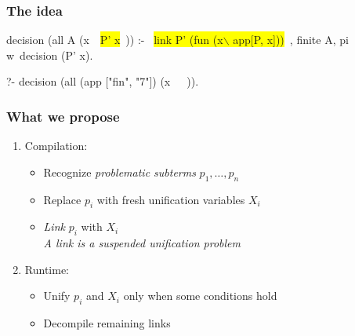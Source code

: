 \documentclass{pres}
\newcommand{\sepFrame}[1]{
  \section{#1}
  \begin{frame}
    \centering
    {\usebeamerfont*{frametitle}\usebeamercolor[fg]{frametitle} #1}
  \end{frame}
}
\begin{document}
\begin{frame}[fragile]
  \frametitle{The idea}

  \begin{elpicode}
    decision (all A (x\ ~\colorbox{yellow}{P' x}~)) :-                      %
      ~\colorbox{yellow}{link P' (fun (x$\backslash$ app[P, x]))}~, 
      finite A,
      pi w\ decision (P' x).

    ?- decision (all (app ["fin", "7"])                 %
                        (x\ ~\appnfactPyg~)).
  \end{elpicode}
  

\end{frame}


\begin{frame}
  \frametitle{What we propose}

  \begin{enumerate}
    \item Compilation:
    \begin{itemize}
      \item Recognize \textit{problematic subterms} $p_1,\dots,p_n$
      \item Replace $p_i$ with fresh unification variables $X_i$
      \item \textit{Link} $p_i$ with $X_i$\\
        \quad \textit{A link is a suspended unification problem}
    \end{itemize}
    \item Runtime:
    \begin{itemize}
      \item Unify $p_i$ and $X_i$ only when some conditions hold
      \item Decompile remaining links
    \end{itemize}
  \end{enumerate}



\end{frame}
\def\llam{\ensuremath{{\mathcal{L}_\lambda}}\xspace}
\end{document}
